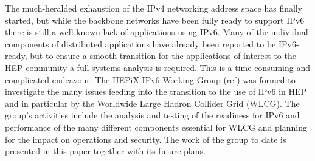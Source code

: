 The much-heralded exhaustion of the IPv4 networking address space has finally started,
but while the backbone networks have been fully ready to support IPv6 there is still a well-known lack of 
applications using IPv6.
Many of the individual components of distributed applications have already been reported to be IPv6-ready,
but to ensure a smooth transition for the applications of interest to the HEP community a full-systems analysis 
is required. This is a time consuming and complicated endeavour.
The HEPiX IPv6 Working Group (ref) was formed to investigate the many issues feeding into the 
transition to the use of IPv6 in HEP and in particular by the Worldwide Large Hadron Collider Grid (WLCG). 
The group's activities include the analysis and testing of the readiness for IPv6 and 
performance of the many different components essential for WLCG and planning for the impact on 
operations and security. The work of the group to date is presented in this paper together with its future plans.
